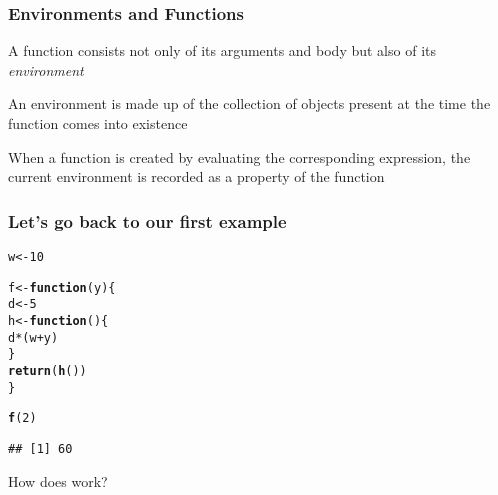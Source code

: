 \documentclass[12pt]{beamer}\usepackage[]{graphicx}\usepackage[]{color}
\makeatletter
\newcommand{\hlnum}[1]{\textcolor[rgb]{0.686,0.059,0.569}{#1}}%
\newcommand{\hlopt}[1]{\textcolor[rgb]{0,0,0}{#1}}%
\newcommand{\hlstd}[1]{\textcolor[rgb]{0.345,0.345,0.345}{#1}}%
\newcommand{\hlkwa}[1]{\textcolor[rgb]{0.161,0.373,0.58}{\textbf{#1}}}%
\newcommand{\hlkwb}[1]{\textcolor[rgb]{0.69,0.353,0.396}{#1}}%
\newcommand{\hlkwc}[1]{\textcolor[rgb]{0.333,0.667,0.333}{#1}}%
\newcommand{\hlkwd}[1]{\textcolor[rgb]{0.737,0.353,0.396}{\textbf{#1}}}%
\newenvironment{kframe}{%
 \def\at@end@of@kframe{}%
 \ifinner\ifhmode%
  \def\at@end@of@kframe{\end{minipage}}%
  \begin{minipage}{\columnwidth}%
 \fi\fi%
 \def\FrameCommand##1{\hskip\@totalleftmargin \hskip-\fboxsep
 \colorbox{shadecolor}{##1}\hskip-\fboxsep
     \hskip-\linewidth \hskip-\@totalleftmargin \hskip\columnwidth}%
 \MakeFramed {\advance\hsize-\width
   \@totalleftmargin\z@ \linewidth\hsize
   \@setminipage}}%
 {\par\unskip\endMakeFramed%
 \at@end@of@kframe}
\newenvironment{knitrout}{}{} %
\makeatother
\begin{document}

\begin{frame}
\frametitle{Environments and Functions}

\bbi
  \item A function consists not only of its arguments and body but also of its \textit{environment}
  \item An environment is made up of the collection of objects present at the time the function comes into existence
  \item When a function is created by evaluating the corresponding expression, the current environment is recorded as a property of the function
\ei

\end{frame}


\begin{frame}[fragile]
\frametitle{Let's go back to our first example}

\begin{knitrout}\footnotesize
{}\color{fgcolor}\begin{kframe}
\begin{alltt}
\hlstd{w} \hlkwb{<-} \hlnum{10}

\hlstd{f} \hlkwb{<-} \hlkwa{function}\hlstd{(}\hlkwc{y}\hlstd{) \{}
  \hlstd{d} \hlkwb{<-} \hlnum{5}
  \hlstd{h} \hlkwb{<-} \hlkwa{function}\hlstd{() \{}
    \hlstd{d} \hlopt{*} \hlstd{(w} \hlopt{+} \hlstd{y)}
  \hlstd{\}}
  \hlkwd{return}\hlstd{(}\hlkwd{h}\hlstd{())}
\hlstd{\}}

\hlkwd{f}\hlstd{(}\hlnum{2}\hlstd{)}
\end{alltt}
\begin{verbatim}
## [1] 60
\end{verbatim}
\end{kframe}
\end{knitrout}

How does  work?

\end{frame}

\end{document}
